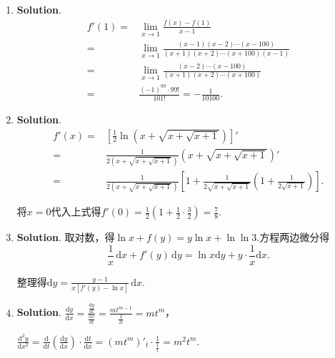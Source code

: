 \documentclass[../Main.tex]{subfiles}
\begin{document}
\begin{enumerate}
    \item \textbf{Solution}.
          \[
              \begin{aligned}
                  f'(1) = & \lim_{x\to1}\frac{f(x)-f(1)}{x-1}                                        \\
                  =       & \lim_{x\to1}\frac{(x-1)(x-2)\cdots(x-100)}{(x+1)(x+2)\cdots(x+100)(x-1)} \\
                  =       & \lim_{x\to1}\frac{(x-2)\cdots(x-100)}{(x+1)(x+2)\cdots(x+100)}           \\
                  =       & \frac{(-1)^{99}\cdot 99!}{101!}=-\frac{1}{10100}.
              \end{aligned}
          \]

    \item \textbf{Solution}.
          \[
              \begin{aligned}
                  f'(x) = & \left[\frac{1}{2}\ln\left(x+\sqrt{x+\sqrt{x+1}}\right)\right]'                                                                  \\
                  =       & \frac{1}{2\left(x+\sqrt{x+\sqrt{x+1}}\right)}\left(x+\sqrt{x+\sqrt{x+1}}\right)'                                                \\
                  =       & \frac{1}{2\left(x+\sqrt{x+\sqrt{x+1}}\right)}\left[1+\frac{1}{2\sqrt{x+\sqrt{x+1}}}\left(1+\frac{1}{2\sqrt{x+1}}\right)\right].
              \end{aligned}
          \]

          将$x=0$代入上式得$f'(0)=\frac{1}{2}\left(1+\frac{1}{2}\cdot\frac{3}{2}\right
              )=\frac{7}{8}$.

    \item \textbf{Solution}. 取对数，得$\ln x + f(y) = y\ln x + \ln\ln 3$.方程两边微分得
          \[
              \frac{1}{x}\,\mathrm{d}x + f'(y)\,\mathrm{d}y = \ln x \mathrm{d}y + y\cdot\frac{1}{x}
              \mathrm{d}x.
          \]

          整理得$\mathrm{d}y=\frac{y-1}{x\left[f'(y)-\ln x\right]}\,\mathrm{d}x$.

    \item \textbf{Solution}. $\frac{\mathrm{d}y}{\mathrm{d}x}=\frac{\frac{\mathrm{d}y}{\mathrm{d}t}}{\frac{\mathrm{d}x}{\mathrm{d}t}}
              =\frac{mt^{m-1}}{\frac{2}{2t}}=mt^{m}$，

          $\frac{\mathrm{d}^{2}y}{\mathrm{d}x^{2}}=\frac{\mathrm{d}}{\mathrm{d}t}\left
              (\frac{\mathrm{d}y}{\mathrm{d}x}\right)\cdot\frac{\mathrm{d}t}{\mathrm{d}x}
              =\left(mt^{m}\right)'_{t}\cdot\frac{1}{\frac{1}{t}}=m^{2} t^{m}$.


\end{enumerate}
\end{document}

